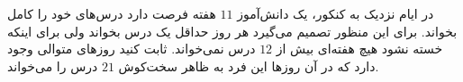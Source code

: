     \p 
در ایام نزدیک به کنکور، یک دانش‌آموز
$11$
هفته فرصت دارد درس‌های خود را کامل بخواند. برای این منظور تصمیم می‌گیرد هر روز حداقل یک درس بخواند ولی برای اینکه خسته نشود هیچ هفته‌ای بیش از
$12$
درس نمی‌خواند. ثابت کنید روزهای متوالی وجود دارد که در آن روزها این فرد به ظاهر سخت‌کوش
$21$
درس را می‌خواند.